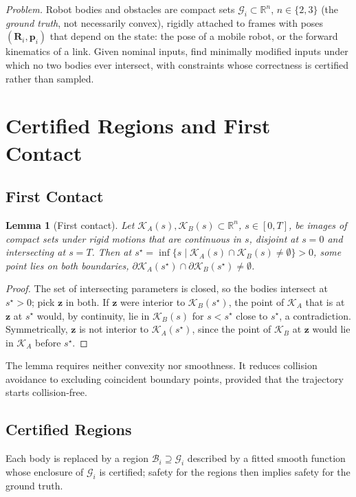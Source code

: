 \documentclass[journal]{IEEEtran}
\newtheorem{lemma}{Lemma}
\theoremstyle{definition}
\newcommand{\R}{\mathbb{R}}
\newcommand{\Rot}{\mathbf{R}}
\begin{document}
\emph{Problem.} Robot bodies and obstacles are compact sets $\mathcal G_i\subset\R^n$, $n\in\{2,3\}$
(the \emph{ground truth}, not necessarily convex), rigidly attached to frames with poses
$(\Rot_i,\mathbf p_i)$ that depend on the state: the pose of a mobile robot, or the forward
kinematics of a link. Given nominal inputs, find minimally modified inputs under which no two
bodies ever intersect, with constraints whose correctness is certified rather than sampled.

\section{Certified Regions and First Contact}\label{sec:regions}

\subsection{First Contact}
\begin{lemma}[First contact]\label{lem:contact}
Let $\mathcal K_A(s),\mathcal K_B(s)\subset\R^n$, $s\in[0,T]$, be images of compact sets under rigid
motions that are continuous in $s$, disjoint at $s=0$ and intersecting at $s=T$. Then at
$s^\star=\inf\{s\mid\mathcal K_A(s)\cap\mathcal K_B(s)\neq\emptyset\}>0$, some point lies on both
boundaries, $\partial\mathcal K_A(s^\star)\cap\partial\mathcal K_B(s^\star)\neq\emptyset$.
\end{lemma}
\begin{proof}
The set of intersecting parameters is closed, so the bodies intersect at $s^\star>0$; pick $\mathbf z$
in both. If $\mathbf z$ were interior to $\mathcal K_B(s^\star)$, the point of $\mathcal K_A$ that
is at $\mathbf z$ at $s^\star$ would, by continuity, lie in $\mathcal K_B(s)$ for $s<s^\star$ close
to $s^\star$, a contradiction. Symmetrically, $\mathbf z$ is not interior to $\mathcal K_A(s^\star)$,
since the point of $\mathcal K_B$ at $\mathbf z$ would lie in $\mathcal K_A$ before $s^\star$.
\end{proof}
The lemma requires neither convexity nor smoothness. It reduces collision avoidance to excluding
coincident boundary points, provided that the trajectory starts collision-free.

\subsection{Certified Regions}\label{sec:cert-body}
Each body is replaced by a region $\mathcal B_i\supseteq\mathcal G_i$ described by a fitted smooth
function whose enclosure of $\mathcal G_i$ is certified; safety for the regions then implies safety
for the ground truth.
\end{document}
